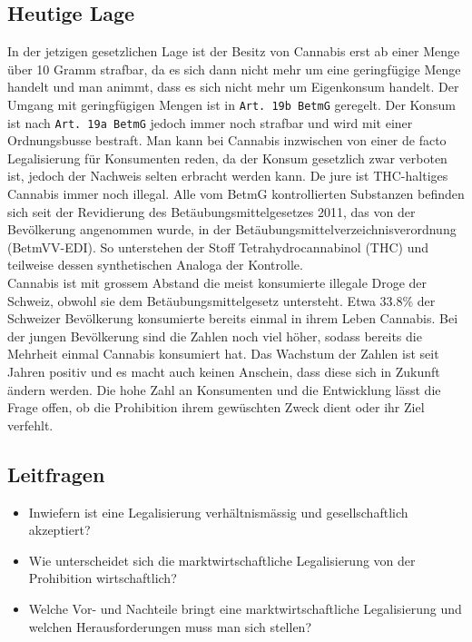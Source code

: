 \documentclass[../main.tex]{subfiles}
\begin{document}
	 
	 \subsection{Heutige Lage}
	 In der jetzigen gesetzlichen Lage ist der Besitz von Cannabis erst ab einer Menge über 10 Gramm strafbar, da es sich dann nicht mehr um eine geringfügige Menge handelt und man animmt, dass es sich nicht mehr um Eigenkonsum handelt.
	 Der Umgang mit geringfügigen Mengen ist in \texttt{Art. 19b BetmG} geregelt.
	 Der Konsum ist nach \texttt{Art. 19a BetmG} jedoch immer noch strafbar und wird mit einer Ordnungsbusse bestraft. 
	 Man kann bei Cannabis inzwischen von einer de facto Legalisierung für Konsumenten reden, da der Konsum gesetzlich zwar verboten ist, jedoch der Nachweis selten erbracht werden kann. 
	 De jure ist THC-haltiges Cannabis immer noch illegal. 
	 Alle vom BetmG kontrollierten Substanzen befinden sich seit der Revidierung des Betäubungsmittelgesetzes 2011, das von der Bevölkerung angenommen wurde, in der Betäubungsmittelverzeichnisverordnung (BetmVV-EDI). 
	 So unterstehen der Stoff Tetrahydrocannabinol (THC) und teilweise dessen synthetischen Analoga der Kontrolle.\\
	 
	 
	 \noindent
	 Cannabis ist mit grossem Abstand die meist konsumierte illegale Droge der Schweiz, obwohl sie dem Betäubungsmittelgesetz untersteht. 
	 Etwa $33.8\%$ der Schweizer Bevölkerung \cite{gmel} konsumierte bereits einmal in ihrem Leben Cannabis. 
	 Bei der jungen Bevölkerung sind die Zahlen noch viel höher, sodass bereits die Mehrheit einmal Cannabis konsumiert hat. 
	 Das Wachstum der Zahlen ist seit Jahren positiv und es macht auch keinen Anschein, dass diese sich in Zukunft ändern werden.
	 Die hohe Zahl an Konsumenten und die Entwicklung lässt die Frage offen, ob die Prohibition ihrem gewüschten Zweck dient oder ihr Ziel verfehlt.
	 
	 
	 \subsection{Leitfragen}
	 
	 \begin{itemize}
	 	\item Inwiefern ist eine Legalisierung verhältnismässig und gesellschaftlich akzeptiert?
	 	\item Wie unterscheidet sich die marktwirtschaftliche Legalisierung von der Prohibition wirtschaftlich?
	 	\item Welche Vor- und Nachteile bringt eine marktwirtschaftliche Legalisierung und welchen Herausforderungen muss man sich stellen?
	 \end{itemize}
\end{document}
